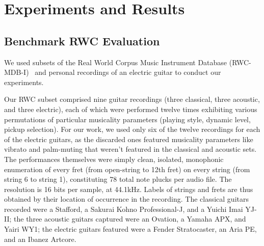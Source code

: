 \documentclass[12pt]{cmuthesis}
\begin{document}
\noindent
\chapter{Experiments and Results}
\label{experiments}
\section{Benchmark RWC Evaluation}

We used subsets of the Real World Corpus Music Instrument Database (RWC-MDB-I)~\cite{goto2003} and personal recordings of an electric guitar to conduct our experiments. 

Our RWC subset comprised nine guitar recordings (three classical, three acoustic, and three electric), each of which were performed twelve times exhibiting various permutations of particular musicality parameters (playing style, dynamic level, pickup selection). For our work, we used only six of the twelve recordings for each of the electric guitars, as the discarded ones featured musicality parameters like vibrato and palm-muting that weren't featured in the classical and acoustic sets. The performances themselves were simply clean, isolated, monophonic enumeration of every fret (from open-string to 12th fret) on every string (from string 6 to string 1), constituting 78 total note plucks per audio file. The resolution is 16 bits per sample, at 44.1kHz. Labels of strings and frets are thus obtained by their location of occurrence in the recording. The classical guitars recorded were a Stafford, a Sakurai Kohno Professional-J, and a Yuichi Imai YJ-II; the three acoustic guitars captured were an Ovation, a Yamaha APX, and Yairi WY1; the electric guitars featured were a Fender Stratocaster, an Aria PE, and an Ibanez Artcore.

\end{document}
